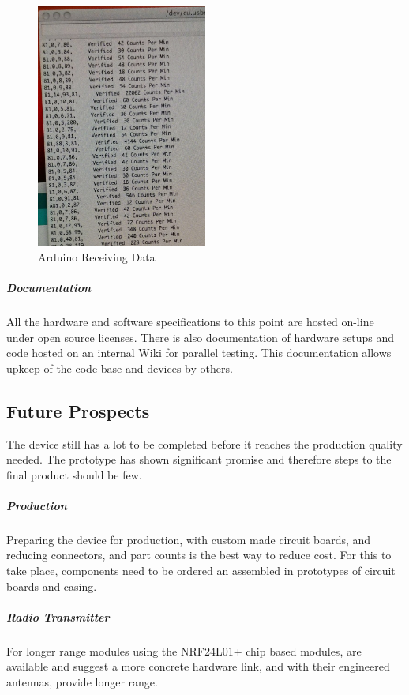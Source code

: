 \documentclass[10pt]{article}
\begin{document}
\begin{figure}[h]
	\centering
	\includegraphics[width=0.5\textwidth]{ArduinoRX}
	\caption{Arduino Receiving Data \label{arduinorx}}
\end{figure}

\subparagraph{Documentation}
All the hardware and software specifications to this point are hosted on-line under open source licenses. There is also documentation of hardware setups and code hosted on an internal Wiki for parallel testing. This documentation allows upkeep of the code-base and devices by others.

\subsection*{Future Prospects}
The device still has a lot to be completed before it reaches the production quality needed. The prototype has shown significant promise and therefore steps to the final product should be few.

\subparagraph{Production}
Preparing the device for production, with custom made circuit boards, and reducing connectors, and part counts is the best way to reduce cost. For this to take place, components need to be ordered an assembled in prototypes of circuit boards and casing.

\subparagraph{Radio Transmitter}

For longer range modules using the NRF24L01+ chip based modules, are available and suggest a more concrete hardware link, and with their engineered antennas, provide longer range.

\pagebreak


\end{document}
